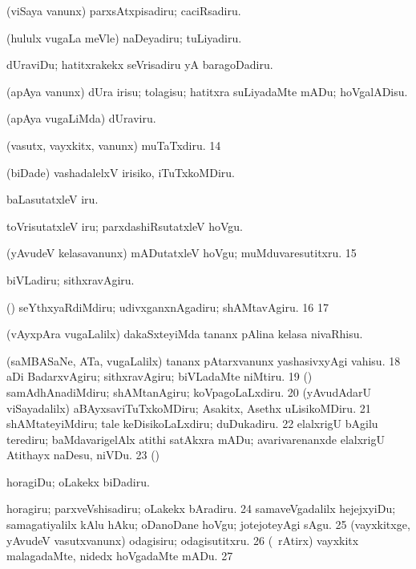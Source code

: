 { (viSaya \mo vanunx) parxsAtxpisadiru; caciRsadiru. 

 (hululx \mo vugaLa meVle) naDeyadiru; tuLiyadiru. 

 dUraviDu; hatitxrakekx seVrisadiru yA baragoDadiru. 

 (apAya \mo vanunx) dUra irisu; tolagisu; hatitxra suLiyadaMte mADu; hoVgalADisu. 

 (apAya \mo vugaLiMda) dUraviru. 

 (vasutx, vayxkitx, \mo vanunx) muTaTxdiru.
\num{14}  

 (biDade) vashadalelxV irisiko, iTuTxkoMDiru.

 baLasutatxleV iru. 

 toVrisutatxleV iru; parxdashiRsutatxleV hoVgu. 

 (yAvudeV kelasavanunx) mADutatxleV hoVgu; muMduvaresutitxru.
\num{15}  

 biVLadiru; sithxravAgiru.

 (\rUpa) seYthxyaRdiMdiru; udivxganxnAgadiru; shAMtavAgiru. 
\num{16} 
\num{17}  

 (vAyxpAra \mo vugaLalilx) dakaSxteyiMda tananx pAlina kelasa nivaRhisu.

 (saMBASaNe, ATa, \mo vugaLalilx) tananx pAtarxvanunx yashasivxyAgi vahisu.
\num{18}  aDi BadarxvAgiru; sithxravAgiru; biVLadaMte niMtiru. 
\num{19}  (\ashi) samAdhAnadiMdiru; shAMtanAgiru; koVpagoLaLxdiru. 
\num{20}  (yAvudAdarU viSayadalilx) aBAyxsaviTuTxkoMDiru; Asakitx, Asethx uLisikoMDiru.
\num{21}  shAMtateyiMdiru; tale keDisikoLaLxdiru; duDukadiru.
\num{22}  elalxrigU bAgilu terediru; baMdavarigelAlx atithi satAkxra mADu; avarivarenanxde elalxrigU Atithayx naDesu,
niVDu. 
\num{23}  (\birx)

 horagiDu; oLakekx biDadiru. 

 horagiru; parxveVshisadiru; oLakekx bAradiru. 
\hypertarget{keepnuga24}{}
\num{24}  samaveVgadalilx hejejxyiDu; samagatiyalilx kAlu hAku; oDanoDane hoVgu; jotejoteyAgi sAgu. 
\num{25}  (vayxkitxge, yAvudeV vasutxvanunx) odagisiru; odagisutitxru.
\num{26}  (\kanmu\ rAtirx) vayxkitx malagadaMte, nidedx
hoVgadaMte mADu. 
\num{27}  

}
